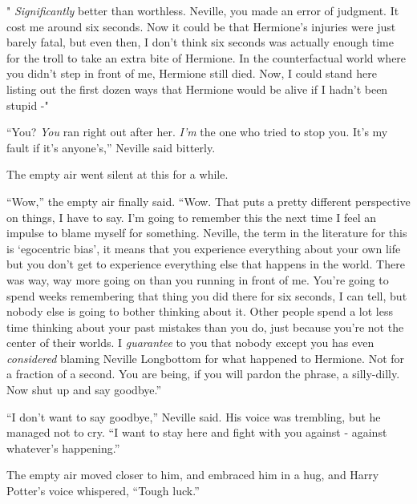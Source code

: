 " \emph{Significantly} better than worthless. Neville, you made an error
of judgment. It cost me around six seconds. Now it could be that
Hermione's injuries were just barely fatal, but even then, I don't think
six seconds was actually enough time for the troll to take an extra bite
of Hermione. In the counterfactual world where you didn't step in front
of me, Hermione still died. Now, I could stand here listing out the
first dozen ways that Hermione would be alive if I hadn't been stupid -"

``You? \emph{You} ran right out after her. \emph{I'm} the one who tried
to stop you. It's my fault if it's anyone's,'' Neville said bitterly.

The empty air went silent at this for a while.

``Wow,'' the empty air finally said. ``Wow. That puts a pretty different
perspective on things, I have to say. I'm going to remember this the
next time I feel an impulse to blame myself for something. Neville, the
term in the literature for this is `egocentric bias', it means that you
experience everything about your own life but you don't get to
experience everything else that happens in the world. There was way, way
more going on than you running in front of me. You're going to spend
weeks remembering that thing you did there for six seconds, I can tell,
but nobody else is going to bother thinking about it. Other people spend
a lot less time thinking about your past mistakes than you do, just
because you're not the center of their worlds. I \emph{guarantee} to you
that nobody except you has even \emph{considered} blaming Neville
Longbottom for what happened to Hermione. Not for a fraction of a
second. You are being, if you will pardon the phrase, a silly-dilly. Now
shut up and say goodbye.''

``I don't want to say goodbye,'' Neville said. His voice was trembling,
but he managed not to cry. ``I want to stay here and fight with you
against - against whatever's happening.''

The empty air moved closer to him, and embraced him in a hug, and Harry
Potter's voice whispered, ``Tough luck.''
